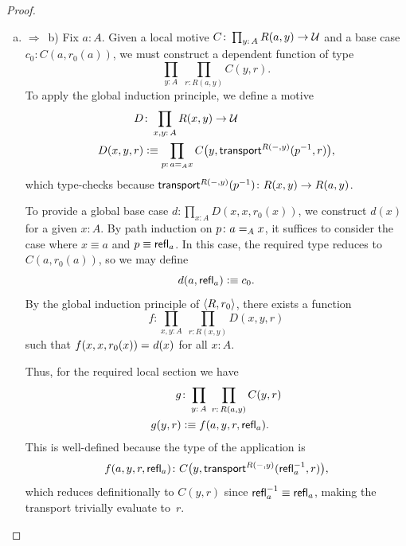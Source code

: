 \begin{proof}\ 
    \begin{enumerate}[a),font=\upshape]
        \item $\Rightarrow$~b) Fix $a\colon A$. Given a local motive $C\colon\prod_{y\colon A}R(a,y)\to\univ$ and a base case $c_0\colon C(a,r_0(a))$, we must construct a dependent function of type
        \[
            \prod_{y\colon A}\;
            \prod_{r\colon R(a,y)}
                C(y,r).
        \]
        To apply the global induction principle, we define a motive
        \begin{align*}
            D&\colon\prod_{x,y\colon A}R(x,y)\to\univ\\
            D(x,y,r)&\defeq
                \prod_{p\colon a\eq{A}x}
                    C\bigl(
                        y,
                        \fun{transport}^{R(\dummy,y)}
                            (p^{-1},r)
                    \bigr),
        \end{align*}
        which type-checks because $\fun{transport}^{R(\dummy,y)}(p^{-1})
                \colon R(x,y)\to R(a,y)$.
        
        To provide a global base case $d\colon\prod_{x\colon A}D(x,x,r_0(x))$, we construct $d(x)$ for a given $x\colon A$. By path induction on $p\colon a\eq{A}x$, it suffices to consider the case where $x\equiv a$ and $p\equiv\mathsf{refl}_{a}$. In this case, the required type reduces to $C(a,r_0(a))$, so we may define
        \begin{equation}\label{eq:global-base-case}
            d(a,\mathsf{refl}_{a})\mathrel{\vcentcolon}\equiv c_0.
        \end{equation}
        By the global induction principle of $\langle R,r_0\rangle$, there exists a function
        \[
            f\colon\prod_{x,y\colon A}\;
                \prod_{r\colon R(x,y)}D(x,y,r)
        \]
        such that $f(x,x,r_0(x))\mathrel{=_{}}d(x)$ for all $x\colon A$.
        
        Thus, for the required local section we have
        \begin{align}\label{eq:g(y,r)-defn}
            g&\colon
                \prod_{y\colon A}\;
                \prod_{r\colon R(a,y)}C(y,r)
                    \nonumber\\
            g(y,r)&\defeq f(a,y,r,\fun{refl}_{a}).
        \end{align}
        This is well-defined because the type of the application is
        \[
            f(a,y,r,\fun{refl}_{a})\colon 
                C\bigl(y,\fun{transport}^{R(\dummy,y)}
                    (\fun{refl}_{a}^{-1},r)\bigr),
        \]
        which reduces definitionally to $C(y,r)$ since $\mathsf{refl}_{a}^{-1}\equiv\mathsf{refl}_a$, making the transport trivially evaluate to~$r$.
        

\end{enumerate}
\end{proof}

